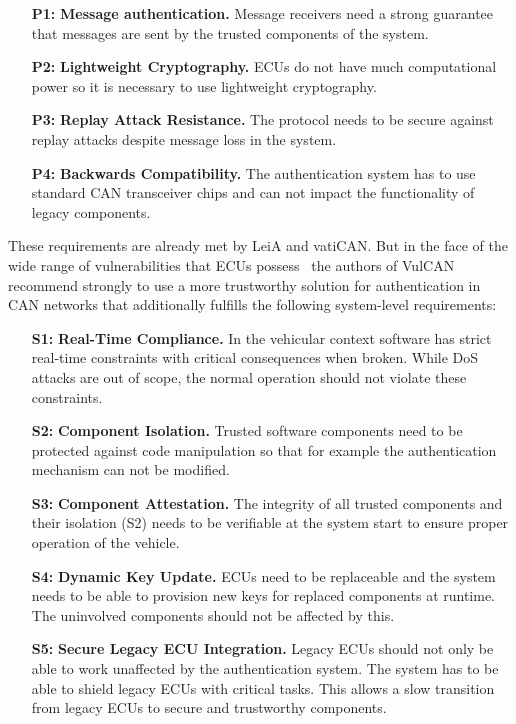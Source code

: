 \begin{enumerate}
    \item[\textbf{P1:}] \textbf{Message authentication. } Message receivers need
    a strong guarantee that messages are sent by the trusted components of the
    system.
    \item[\textbf{P2:}] \textbf{Lightweight Cryptography. } ECUs do not have
    much computational power so it is necessary to use lightweight cryptography.
    \item[\textbf{P3:}] \textbf{Replay Attack Resistance. } The protocol needs
    to be secure against replay attacks despite message loss in the system.
    \item[\textbf{P4:}] \textbf{Backwards Compatibility. } The authentication
    system has to use standard CAN transceiver chips and can not impact the
    functionality of legacy components.
\end{enumerate}

These requirements are already met by LeiA and vatiCAN\@. But in the face of the
wide range of vulnerabilities that ECUs possess~\cite{Checkoway2011,Koscher2010}
the authors of VulCAN recommend strongly to use a more trustworthy solution for
authentication in CAN networks that additionally fulfills the following
system-level requirements:


\begin{enumerate}
    \item[\textbf{S1:}] \textbf{Real-Time Compliance. } In the vehicular context
    software has strict real-time constraints with critical consequences when
    broken. While DoS attacks are out of scope, the normal operation should not
    violate these constraints.
    \item[\textbf{S2:}] \textbf{Component Isolation. } Trusted software
    components need to be protected against code manipulation so that for
    example the authentication mechanism can not be modified.
    \item[\textbf{S3:}] \textbf{Component Attestation. } The integrity of all
    trusted components and their isolation (S2) needs to be verifiable at the
    system start to ensure proper operation of the vehicle.
    \item[\textbf{S4:}] \textbf{Dynamic Key Update. } ECUs need to be
    replaceable and the system needs to be able to provision new keys for
    replaced components at runtime. The uninvolved components should not be
    affected by this.
    \item[\textbf{S5:}] \textbf{Secure Legacy ECU Integration. } Legacy ECUs
    should not only be able to work unaffected by the authentication system. The
    system has to be able to shield legacy ECUs with critical tasks. This allows
    a slow transition from legacy ECUs to secure and trustworthy components.
\end{enumerate}

